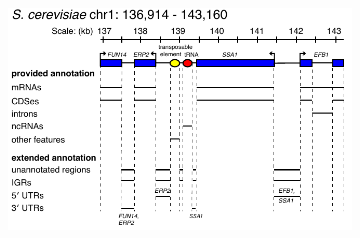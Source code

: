 \documentclass[12pt]{report}
\begin{document}
\begin{figure}
	\begin{subfigure}{1\textwidth}
		\center
		\includegraphics[width=6.5in, height=8in,keepaspectratio]{figures/figure_S2.pdf}	
	\end{subfigure}
	

\end{figure}
\end{document}

